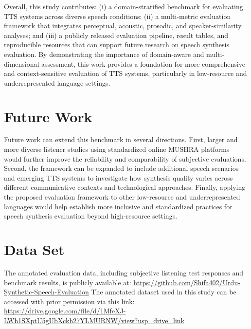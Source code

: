 \documentclass[a4paper,fleqn]{cas-dc}
\begin{document}
\hspace*{1.2em} Overall, this study contributes: (i) a domain-stratified benchmark for evaluating TTS systems across diverse speech conditions; (ii) a multi-metric evaluation framework that integrates perceptual, acoustic, prosodic, and speaker-similarity analyses; and (iii) a publicly released evaluation pipeline, result tables, and reproducible resources that can support future research on speech synthesis evaluation. By demonstrating the importance of domain-aware and multi-dimensional assessment, this work provides a foundation for more comprehensive and context-sensitive evaluation of TTS systems, particularly in low-resource and underrepresented language settings.
        
    
    \section{Future Work}\label{sec:futurework}
    
\hspace*{1.2em} Future work can extend this benchmark in several directions. First, larger and more diverse listener studies using standardized online MUSHRA platforms would further improve the reliability and comparability of subjective evaluations. Second, the framework can be expanded to include additional speech scenarios and emerging TTS systems to investigate how synthesis quality varies across different communicative contexts and technological approaches. Finally, applying the proposed evaluation framework to other low-resource and underrepresented languages would help establish more inclusive and standardized practices for speech synthesis evaluation beyond high-resource settings.

    \section*{Data Set}
\hspace*{1.2em} The annotated evaluation data, including subjective listening test responses and benchmark results, is publicly available at: \url{https://github.com/Shifa402/Urdu-Synthetic-Speech-Evaluation}
The annotated dataset used in this study can be accessed with prior permission via this link: \url{https://drive.google.com/file/d/1MfeXJ-LWh1SXptU5gUbXckh27YLMURNW/view?usp=drive_link}
\end{document}
